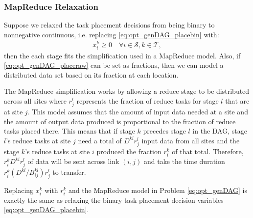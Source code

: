 \subsubsection{MapReduce Relaxation}
Suppose we relaxed the task placement decisions from being binary to nonnegative continuous, i.e. replacing \eqref{eq:opt_genDAG_placebin} with:
\begin{align}
	x_i^k \geq 0 \quad \forall i\in\mathcal{S},k\in\mathcal{T},
\end{align}
then the each stage fits the simplification used in a MapReduce model.
Also, if \eqref{eq:opt_genDAG_placeraw} can be set as fractions, then we can model a distributed data set based on its fraction at each location.

The MapReduce simplification works by allowing a reduce stage to be distributed across all sites where $r^l_j$ represents the fraction of reduce tasks for stage $l$ that are at site $j$.
This model assumes that the amount of input data needed at a site and the amount of output data produced is proportional to the fraction of reduce tasks placed there.
This means that if stage $k$ precedes stage $l$ in the DAG, stage $l$'s reduce tasks at site $j$ need a total of $D^{kl}r_j^l$ input data from all sites and the stage $k$'s reduce tasks at site $i$ produced the fraction $r_i^k$ of that total.
Therefore, $r_i^kD^{kl}r_j^l$ of data will be sent across link $(i,j)$ and take the time duration $r_i^k(D^{kl}/B_{ij}^{kl})r_j^l$ to transfer.

Replacing $x_i^k$ with $r_i^k$ and the MapReduce model in Problem \eqref{eq:opt_genDAG} is exactly the same as relaxing the binary task placement decision variables \eqref{eq:opt_genDAG_placebin}.

